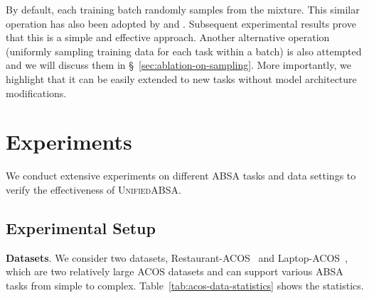 \documentclass[11pt]{article}
\newcommand{\UnifiedABSA}{\textsc{UnifiedABSA}\xspace}
\begin{document}
By default, each training batch randomly samples from the mixture. This similar operation has also been adopted by \citet{raffel2020t5} and \citet{khashabi-etal-2020-unifiedqa}. Subsequent experimental results prove that this is a simple and effective approach. Another alternative operation (uniformly sampling training data for each task within a batch) is also attempted and we will discuss them in \S~\ref{sec:ablation-on-sampling}. More importantly, we highlight that it can be easily extended to new tasks without model architecture modifications. 


\section{Experiments}

We conduct extensive experiments on different ABSA tasks and data settings to verify the effectiveness of \UnifiedABSA.

\subsection{Experimental Setup}
\label{sec:exp-setup}

\noindent\textbf{Datasets}. We consider two datasets, Restaurant-ACOS~\citep{cai-etal-2021-acos} and Laptop-ACOS~\citep{cai-etal-2021-acos}, which are two relatively large ACOS datasets and can support various ABSA tasks from simple to complex. Table~\ref{tab:acos-data-statistics} shows the statistics.





\begin{table}[htbp]
\centering
{}
\caption{Statistics of Restaurant-ACOS and Laptop-ACOS deriving from~\citet{cai-etal-2021-acos}. \#Cate. and \#Quad. denote the number of unique categories and ACOS quadruples contained in the dataset, respectively.}
\label{tab:acos-data-statistics}  
\end{table}
 
\end{document}
